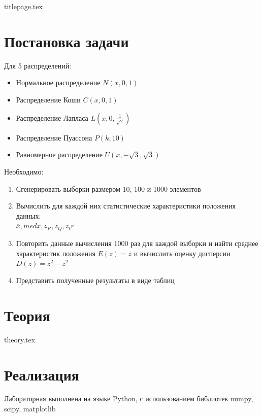 \documentclass[12pt]{article}
\begin{document}
{titlepage.tex}

\tableofcontents
\clearpage

\listoffigures
\clearpage

\listoftables
\clearpage
 

\section{Постановка задачи}
Для 5 распределений:
\begin{itemize}
    \item Нормальное распределение $N(x,0,1)$
    \item Распределение Коши $C(x,0,1)$
    \item Распределение Лапласа $L(x,0,\frac{1}{\sqrt{2}})$
    \item Распределение Пуассона $P(k,10)$
    \item Равномерное распределение $U(x,-\sqrt{3},\sqrt{3})$
\end{itemize}

Необходимо:
\begin{enumerate}
    \item Сгенерировать выборки размером 10, 100 и 1000 элементов
    \item Вычислить для каждой них статистические характеристики положения данных: \\ $\overline{x}, med x, z_R, z_Q, z_tr$
    \item Повторить данные вычисления 1000 раз для каждой выборки и найти среднее характеристик положения $E(z)=\overline{z}$ и вычислить оценку дисперсии $D(z)=\overline{z^2}-{\overline{z}}^2$
    \item Представить полученные результаты в виде таблиц
\end{enumerate}


\section{Теория}
{theory.tex}



\section{Реализация}
Лабораторная выполнена на языке Python, с использованием библиотек numpy, scipy,
matplotlib
\end{document}
